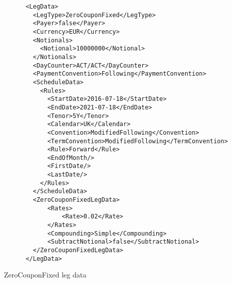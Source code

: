 \begin{listing}[H]
\begin{verbatim}
      <LegData>
        <LegType>ZeroCouponFixed</LegType>
        <Payer>false</Payer>
        <Currency>EUR</Currency>
        <Notionals>
          <Notional>10000000</Notional>
        </Notionals>
        <DayCounter>ACT/ACT</DayCounter>
        <PaymentConvention>Following</PaymentConvention>
        <ScheduleData>
          <Rules>
            <StartDate>2016-07-18</StartDate>
            <EndDate>2021-07-18</EndDate>
            <Tenor>5Y</Tenor>
            <Calendar>UK</Calendar>
            <Convention>ModifiedFollowing</Convention>
            <TermConvention>ModifiedFollowing</TermConvention>
            <Rule>Forward</Rule>
            <EndOfMonth/>
            <FirstDate/>
            <LastDate/>
          </Rules>
        </ScheduleData>
        <ZeroCouponFixedLegData>
            <Rates>
                <Rate>0.02</Rate>
            </Rates>
            <Compounding>Simple</Compounding>
            <SubtractNotional>false</SubtractNotional>
        </ZeroCouponFixedLegData>
      </LegData>
\end{verbatim}
\caption{ZeroCouponFixed leg data}
\label{lst:zerolegdata}
\end{listing}

